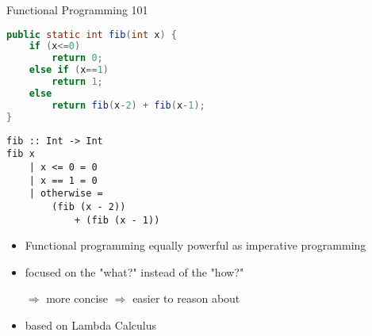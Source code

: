 \begin{frame}[fragile]{Functional Programming 101}
\begin{minipage}{0.5\textwidth}
\begin{lstlisting}[frame=htrbl, language=java]
public static int fib(int x) {
	if (x<=0)
		return 0;
	else if (x==1)
		return 1;
	else
		return fib(x-2) + fib(x-1);
}
\end{lstlisting}
\end{minipage}
\hfill
\begin{minipage}{0.4\textwidth}
\begin{lstlisting}[frame=htrbl]
fib :: Int -> Int
fib x
	| x <= 0 = 0
	| x == 1 = 0
	| otherwise = 
		(fib (x - 2))
			+ (fib (x - 1))
\end{lstlisting}
\end{minipage}

\begin{itemize}
\item Functional programming equally powerful as imperative programming

\item focused on the "what?" instead of the "how?"

$\Rightarrow$ more concise $\Rightarrow$ easier to reason about

\item based on Lambda Calculus
\end{itemize}
\end{frame}